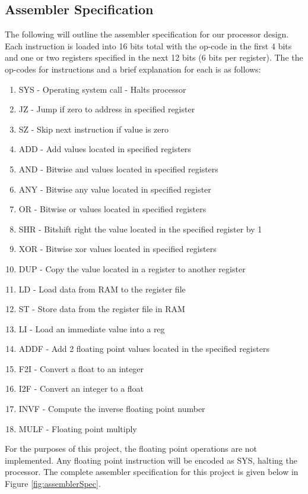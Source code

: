 \documentclass[conference]{IEEEtran}
\begin{document}
\subsection{Assembler Specification}
The following will outline the assembler specification for our processor design. 
Each instruction is loaded into 16 bits total with the op-code in the first 4 bits and one or two registers specified in the next 12 bits (6 bits per register).
The the op-codes for instructions and a brief explanation for each is as follows:
\begin{enumerate}
\item SYS  - Operating system call - Halts processor 
\item JZ   - Jump if zero to address in specified register
\item SZ   - Skip next instruction if value is zero
\item ADD  - Add values located in specified registers
\item AND  - Bitwise and values located in specified registers
\item ANY  - Bitwise any value located in specified register
\item OR   - Bitwise or values located in specified registers
\item SHR  - Bitshift right the value located in the specified register by 1
\item XOR  - Bitwise xor values located in specified registers
\item DUP  - Copy the value located in a register to another register
\item LD   - Load data from RAM to the register file
\item ST   - Store data from the register file in RAM
\item LI   - Load an immediate value into a reg
\item ADDF - Add 2 floating point values located in the specified registers
\item F2I  - Convert a float to an integer
\item I2F  - Convert an integer to a float
\item INVF - Compute the inverse floating point number
\item MULF - Floating point multiply
\end{enumerate}

For the purposes of this project, the floating point operations are not implemented.
Any floating point instruction will be encoded as SYS, halting the processor.
The complete assembler specification for this project is given below in Figure \ref{fig:assemblerSpec}.
\end{document}
